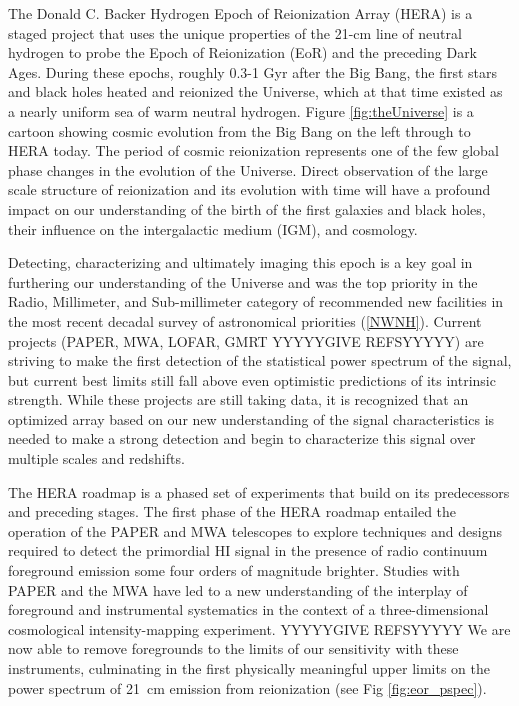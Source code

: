 \documentclass[ars]{/Users/daviddeboer1/Documents/Papers/Copernicus_LaTeX_Package_v_2_7/copernicus}
\begin{document}
\introduction  %
\label{sec:intro}
The Donald C. Backer Hydrogen Epoch of Reionization Array (HERA) is a staged project
that uses the unique properties of the 21-cm line of neutral hydrogen to probe the
Epoch of Reionization (EoR) and the preceding Dark Ages. During these epochs, roughly
0.3-1 Gyr after the Big Bang, the first stars and black holes heated and reionized
the Universe, which at that time existed as a nearly uniform sea of warm neutral
hydrogen.  Figure \ref{fig:theUniverse} is a cartoon showing cosmic evolution from the Big Bang on the left through
to HERA today. The period of cosmic reionization represents one of the few global
phase changes in the evolution of the Universe.
Direct observation of the large scale structure of reionization and its
evolution with time will have a profound impact on our understanding of the birth of
the first galaxies and black holes, their influence on the intergalactic medium
(IGM), and cosmology.

Detecting, characterizing and ultimately imaging this epoch is a key goal in
furthering our understanding of the Universe and was the top priority in the Radio,
Millimeter, and Sub-millimeter category of recommended new facilities in the most
recent decadal survey of astronomical priorities (\ref{NWNH}). Current projects
(PAPER, MWA, LOFAR, GMRT YYYYYGIVE REFSYYYYY) are striving to make the first detection of the statistical
power spectrum of the signal, but current best limits still fall above even
optimistic predictions of its intrinsic strength. While these projects are still
taking data, it is recognized that an optimized array based on our new understanding
of the signal characteristics is needed to make a strong detection and begin to
characterize this signal over multiple scales and redshifts.

The HERA roadmap is a phased set of experiments that build on its predecessors and preceding stages.
The first phase of the HERA roadmap entailed the operation of the
PAPER and MWA telescopes to explore techniques and designs required to
detect the primordial HI signal in the presence of radio continuum
foreground emission some four orders of magnitude brighter. Studies
with PAPER and the MWA have led to a new understanding of the
interplay of foreground and instrumental systematics in the context of
a three-dimensional cosmological intensity-mapping experiment.  YYYYYGIVE REFSYYYYY 
We are
now able to remove foregrounds to the limits of our sensitivity with
these instruments, culminating in the first physically meaningful
upper limits on the power spectrum of 21~cm emission from
reionization (see Fig \ref{fig:eor_pspec}).
\end{document}
